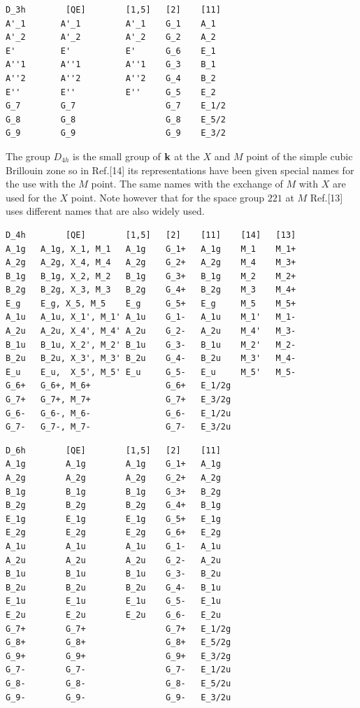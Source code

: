 \documentclass[12pt,a4paper]{article}
\begin{document}
\begin{verbatim}
D_3h        [QE]        [1,5]   [2]    [11]
A'_1       A'_1         A'_1    G_1    A_1
A'_2       A'_2         A'_2    G_2    A_2
E'         E'           E'      G_6    E_1
A''1       A''1         A''1    G_3    B_1
A''2       A''2         A''2    G_4    B_2
E''        E''          E''     G_5    E_2
G_7        G_7                  G_7    E_1/2
G_8        G_8                  G_8    E_5/2
G_9        G_9                  G_9    E_3/2
\end{verbatim}

The group $D_{4h}$ is the small group of ${\bf k}$ at the $X$ and $M$
point of the simple cubic Brillouin zone so in Ref.[14] its representations 
have been given special names for the use with the $M$ point. The same names 
with the exchange of $M$ with $X$ are used for the $X$ point. Note however
that for the space group $221$ at $M$ Ref.[13] uses different names that
are also widely used.
\begin{verbatim}
D_4h        [QE]        [1,5]   [2]    [11]    [14]   [13]
A_1g   A_1g, X_1, M_1   A_1g    G_1+   A_1g    M_1    M_1+
A_2g   A_2g, X_4, M_4   A_2g    G_2+   A_2g    M_4    M_3+
B_1g   B_1g, X_2, M_2   B_1g    G_3+   B_1g    M_2    M_2+
B_2g   B_2g, X_3, M_3   B_2g    G_4+   B_2g    M_3    M_4+
E_g    E_g, X_5, M_5    E_g     G_5+   E_g     M_5    M_5+
A_1u   A_1u, X_1', M_1' A_1u    G_1-   A_1u    M_1'   M_1-  
A_2u   A_2u, X_4', M_4' A_2u    G_2-   A_2u    M_4'   M_3-
B_1u   B_1u, X_2', M_2' B_1u    G_3-   B_1u    M_2'   M_2-
B_2u   B_2u, X_3', M_3' B_2u    G_4-   B_2u    M_3'   M_4-
E_u    E_u,  X_5', M_5' E_u     G_5-   E_u     M_5'   M_5-
G_6+   G_6+, M_6+               G_6+   E_1/2g
G_7+   G_7+, M_7+               G_7+   E_3/2g
G_6-   G_6-, M_6-               G_6-   E_1/2u
G_7-   G_7-, M_7-               G_7-   E_3/2u
\end{verbatim}

\begin{verbatim}
D_6h        [QE]        [1,5]   [2]    [11]
A_1g        A_1g        A_1g    G_1+   A_1g
A_2g        A_2g        A_2g    G_2+   A_2g
B_1g        B_1g        B_1g    G_3+   B_2g
B_2g        B_2g        B_2g    G_4+   B_1g
E_1g        E_1g        E_1g    G_5+   E_1g
E_2g        E_2g        E_2g    G_6+   E_2g
A_1u        A_1u        A_1u    G_1-   A_1u
A_2u        A_2u        A_2u    G_2-   A_2u
B_1u        B_1u        B_1u    G_3-   B_2u
B_2u        B_2u        B_2u    G_4-   B_1u
E_1u        E_1u        E_1u    G_5-   E_1u
E_2u        E_2u        E_2u    G_6-   E_2u
G_7+        G_7+                G_7+   E_1/2g
G_8+        G_8+                G_8+   E_5/2g
G_9+        G_9+                G_9+   E_3/2g
G_7-        G_7-                G_7-   E_1/2u
G_8-        G_8-                G_8-   E_5/2u
G_9-        G_9-                G_9-   E_3/2u
\end{verbatim}
\end{document}
